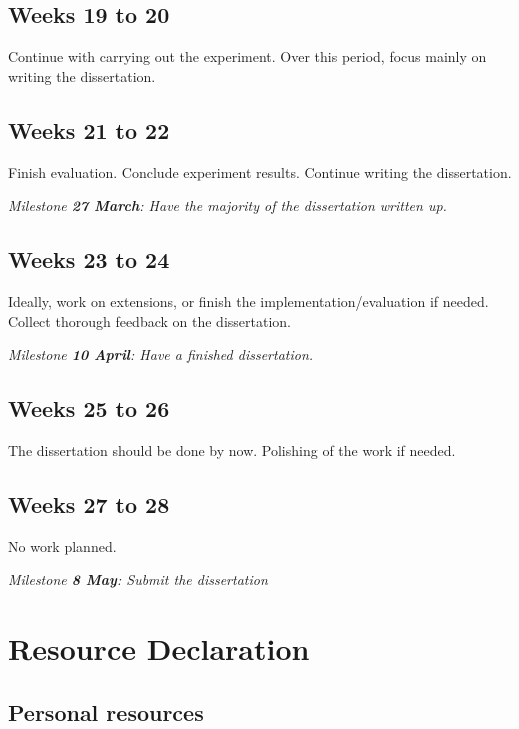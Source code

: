 \documentclass[12pt,a4paper,twoside]{article}
\begin{document}
	\subsection*{Weeks 19 to 20}
	
		Continue with carrying out the experiment. Over this period, focus mainly on writing the dissertation.
		
	
	\subsection*{Weeks 21 to 22}
	
		Finish evaluation. Conclude experiment results. Continue writing the dissertation.
		
		\textit{Milestone \textbf{27 March}: Have the majority of the dissertation written up.}
	
	\subsection*{Weeks 23 to 24}
	
	    Ideally, work on extensions, or finish the implementation/evaluation if needed. Collect thorough feedback on the dissertation.
		
		\textit{Milestone \textbf{10 April}: Have a finished dissertation.}
	
	\subsection*{Weeks 25 to 26}
		
		The dissertation should be done by now. Polishing of the work if needed.
		
		
	\subsection*{Weeks 27 to 28}
	
	    No work planned.
	    
	    \textit{Milestone \textbf{8 May}: Submit the dissertation}

\section*{Resource Declaration}\label{sec:resourcedeclaration}

    \subsection*{Personal resources}
\end{document}

